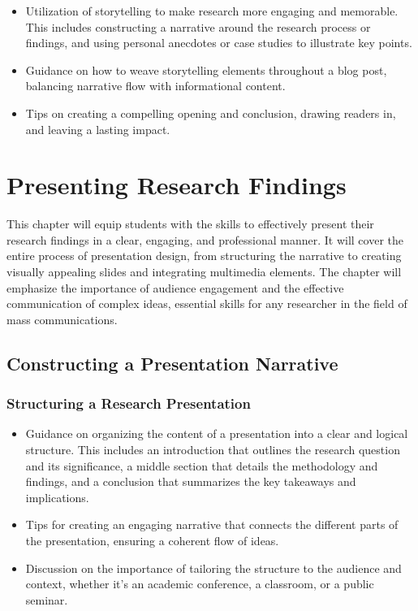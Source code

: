 \documentclass[
]{book}
\begin{document}
\begin{itemize}
\item
  Utilization of storytelling to make research more engaging and memorable. This includes constructing a narrative around the research process or findings, and using personal anecdotes or case studies to illustrate key points.
\item
  Guidance on how to weave storytelling elements throughout a blog post, balancing narrative flow with informational content.
\item
  Tips on creating a compelling opening and conclusion, drawing readers in, and leaving a lasting impact.
\end{itemize}

\hypertarget{presenting-research-findings}{%
\chapter*{Presenting Research Findings}\label{presenting-research-findings}}

This chapter will equip students with the skills to effectively present their research findings in a clear, engaging, and professional manner. It will cover the entire process of presentation design, from structuring the narrative to creating visually appealing slides and integrating multimedia elements. The chapter will emphasize the importance of audience engagement and the effective communication of complex ideas, essential skills for any researcher in the field of mass communications.

\hypertarget{constructing-a-presentation-narrative}{%
\section*{Constructing a Presentation Narrative}\label{constructing-a-presentation-narrative}}

\hypertarget{structuring-a-research-presentation}{%
\subsection*{Structuring a Research Presentation}\label{structuring-a-research-presentation}}

\begin{itemize}
\item
  Guidance on organizing the content of a presentation into a clear and logical structure. This includes an introduction that outlines the research question and its significance, a middle section that details the methodology and findings, and a conclusion that summarizes the key takeaways and implications.
\item
  Tips for creating an engaging narrative that connects the different parts of the presentation, ensuring a coherent flow of ideas.
\item
  Discussion on the importance of tailoring the structure to the audience and context, whether it's an academic conference, a classroom, or a public seminar.
\end{itemize}
\end{document}
